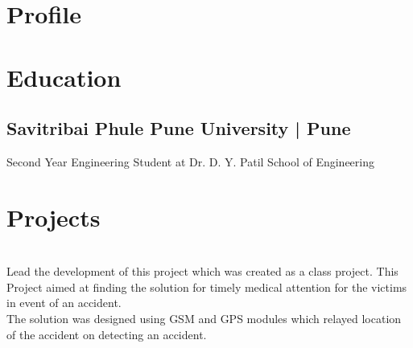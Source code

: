 \documentclass[]{resume}
\begin{document}
%
%
\lastupdated 


%
%

%
%

\begin{minipage}[t]{0.60\textwidth}
\bigskip
\section{Profile}

\bigskip
\bigskip

\section{Education}


\subsection{Savitribai Phule Pune University | Pune}
Second Year Engineering Student at Dr. D. Y. Patil School of Engineering \\

\smallskip
{}

\sectionsep

\bigskip
\bigskip


\section{Projects}
 \\
\textbullet{} Lead the development of this project which was created as a class project.
\textbullet{} This Project aimed at finding the solution for timely medical attention for the victims in event of an accident.\\ 
\textbullet{} The solution was designed using GSM and GPS modules which relayed location of the accident on detecting an accident.
\sectionsep


\end{minipage}
\end{document}
